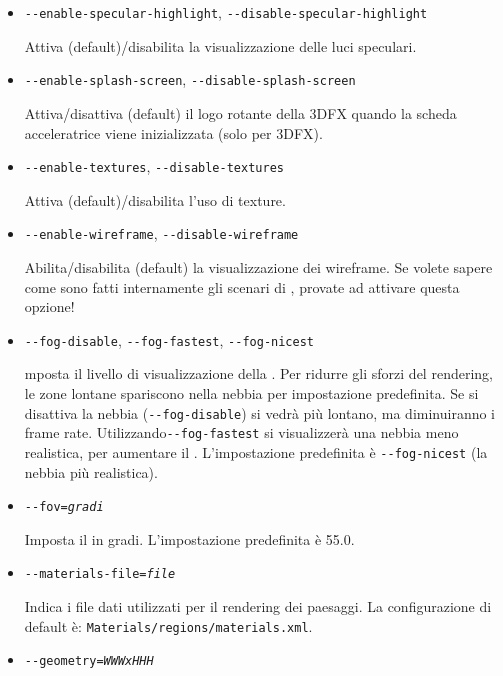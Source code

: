 {\begin{itemize}
  \item{\texttt{-$ $-enable-specular-highlight}, \texttt{-$ $-disable-specular-highlight}}

  Attiva (default)/disabilita la visualizzazione delle luci speculari.

  \item{\texttt{-$ $-enable-splash-screen}, \texttt{-$ $-disable-splash-screen}}

  Attiva/disattiva (default) il logo rotante della 3DFX quando la scheda acceleratrice viene inizializzata (solo per 3DFX).

  \item{\texttt{-$ $-enable-textures}, \texttt{-$ $-disable-textures}}

  Attiva (default)/disabilita l'uso di texture.

  \item{\texttt{-$ $-enable-wireframe}, \texttt{-$ $-disable-wireframe}}

  Abilita/disabilita (default) la visualizzazione dei wireframe.
  Se volete sapere come sono fatti internamente gli scenari di \FlightGear{},
  provate ad attivare questa opzione! 

  \item{\texttt{-$ $-fog-disable}, \texttt{-$ $-fog-fastest}, \texttt{-$ $-fog-nicest}}

  mposta il livello di visualizzazione della . Per ridurre gli sforzi del rendering,
  le zone lontane spariscono nella nebbia per impostazione predefinita. Se si disattiva la nebbia
  (\texttt{-$ $-fog-disable}) si vedr\`{a} pi\`{u} lontano, ma diminuiranno i frame rate.
  Utilizzando\texttt{-$ $-fog-fastest} si visualizzer\`{a} una nebbia meno realistica,
  per aumentare il . L'impostazione predefinita \`{e}  \texttt{-$ $-fog-nicest}
  (la nebbia pi\`{u} realistica).

  \item{\texttt{-$ $-fov={\it gradi}}}

  Imposta il  in gradi. L'impostazione predefinita \`{e} 55.0.

  \item{\texttt{-$ $-materials-file={\it file}}}

  Indica i file dati utilizzati per il rendering dei paesaggi.
  La configurazione di default \`{e}:  \texttt{Materials/regions/materials.xml}.

  \item{\texttt{-$ $-geometry={\it WWWxHHH}}}


\end{itemize}}
